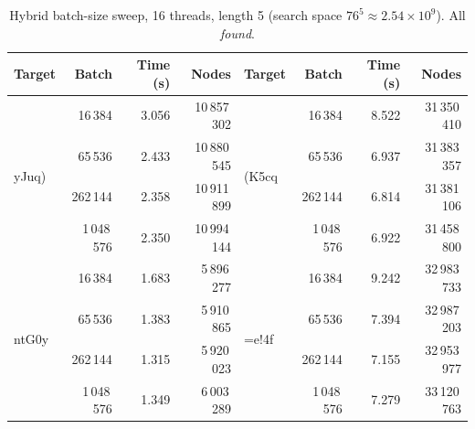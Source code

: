 \documentclass[11pt,a4paper]{article}
\begin{document}
\begin{table}[H]
\centering
\caption{Hybrid batch-size sweep, 16 threads, length 5 (search space $76^{5}\approx2.54\times10^{9}$). All \emph{found}.}
\label{tab:hyb5}
\small
\begin{tabular}{@{}lrrr@{\hskip 1.2em}lrrr@{}}
\toprule
\textbf{Target} & \textbf{Batch} & \textbf{Time (s)} & \textbf{Nodes} &
\textbf{Target} & \textbf{Batch} & \textbf{Time (s)} & \textbf{Nodes} \\
\midrule
\multirow{4}{*}{yJuq)}
 & 16\,384   & 3.056 & 10\,857\,302 & \multirow{4}{*}{(K5cq} & 16\,384   & 8.522 & 31\,350\,410 \\
 & 65\,536   & 2.433 & 10\,880\,545 &                        & 65\,536   & 6.937 & 31\,383\,357 \\
 & 262\,144  & 2.358 & 10\,911\,899 &                        & 262\,144  & 6.814 & 31\,381\,106 \\
 & 1\,048\,576 & 2.350 & 10\,994\,144 &                      & 1\,048\,576 & 6.922 & 31\,458\,800 \\
\midrule
\multirow{4}{*}{ntG0y}
 & 16\,384   & 1.683 & 5\,896\,277 & \multirow{4}{*}{=e!4f}  & 16\,384   & 9.242 & 32\,983\,733 \\
 & 65\,536   & 1.383 & 5\,910\,865 &                         & 65\,536   & 7.394 & 32\,987\,203 \\
 & 262\,144  & 1.315 & 5\,920\,023 &                         & 262\,144  & 7.155 & 32\,953\,977 \\
 & 1\,048\,576 & 1.349 & 6\,003\,289 &                       & 1\,048\,576 & 7.279 & 33\,120\,763 \\
\bottomrule
\end{tabular}
\end{table}

\end{document}
